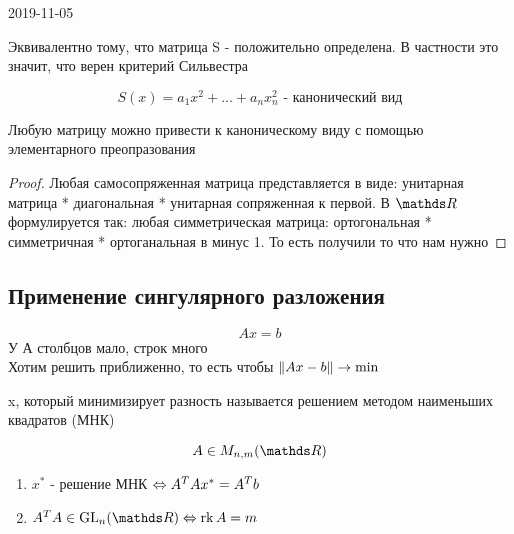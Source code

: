 \documentclass[12pt, fleqn]{article}
\begin{document}
\begin{lect}{2019-11-05}
  \begin{remark}
    Эквивалентно тому, что матрица S - положительно определена. В частности это значит, что верен критерий Сильвестра
  \end{remark}

  \begin{Definition}
    \[S(x) = a_1 x^2 + ... + a_n x_n^2 \text{ - канонический вид}\]
  \end{Definition}

  \begin{theorem}
    Любую матрицу можно привести к каноническому виду с помощью элементарного преопразования
  \end{theorem}

  \begin{proof}
    Любая самосопряженная матрица представляется в виде: унитарная матрица * диагональная * унитарная сопряженная к первой. В $\R$ формулируется так: любая симметрическая матрица: ортогональная * симметричная * ортоганальная в минус 1. То есть получили то что нам нужно
  \end{proof}

  \subsection{Применение сингулярного разложения}
  \[Ax = b\]
  У А столбцов мало, строк много\\
  Хотим решить приближенно, то есть чтобы $\lVert Ax-b \rVert \rightarrow \min$

  \begin{definition}
    x, который минимизирует разность называется решением методом наименьших квадратов (МНК)
  \end{definition}

  \begin{Theorem}
    \[A \in M_{n,m}(\R)\]
    \begin{enumerate}
      \item $x^*$ - решение МНК $\Leftrightarrow A^T A x^* = A^T b$
      \item $A^T A \in \GL_n(\R) \lra \rk A = m$
    \end{enumerate}
  \end{Theorem}


\end{lect}
\end{document}
